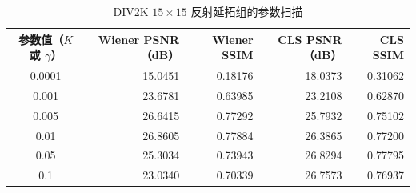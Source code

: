 \begin{table}[H]
\centering
\caption{DIV2K $15\times15$ 反射延拓组的参数扫描}
\label{tab:param}
\begin{tabular}{crrrr}
\toprule
参数值（$K$ 或 $\gamma$） & Wiener PSNR（dB） & Wiener SSIM & CLS PSNR（dB） & CLS SSIM \\
\midrule
0.0001 & 15.0451 & 0.18176 & 18.0373 & 0.31062 \\
0.001 & 23.6781 & 0.63985 & 23.2108 & 0.62870 \\
0.005 & 26.6415 & 0.77292 & 25.7932 & 0.75102 \\
0.01 & 26.8605 & 0.77884 & 26.3865 & 0.77200 \\
0.05 & 25.3034 & 0.73943 & 26.8294 & 0.77795 \\
0.1 & 23.0340 & 0.70339 & 26.7573 & 0.76937 \\
\bottomrule
\end{tabular}
\end{table}
